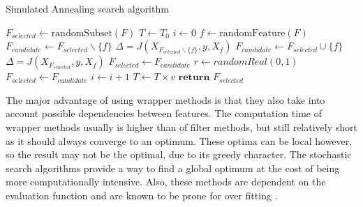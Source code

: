 \documentclass[10pt,a4paper]{report}
\begin{document}
\begin{itemize}
		\begin{algorithm}[H]
			\caption{Simulated Annealing search algorithm \cite{Reunanen2006}}\label{alg:SASearch}
			\begin{algorithmic}[1]
				\State $F_{\textit{selected}} \gets \text{randomSubset}(F)$	
				\State $T \gets T_0$			
							
				\State $i \gets 0$				
								
				\State $f \gets \text{randomFeature}(F)$	
					
				\State $F_{\textit{candidate}} \gets  F_{\textit{selected}} \backslash \{f\}$ 
				\State $\Delta = J(X_{F_{\textit{selected}} \backslash \{f\}}, y, X_f)$ 
				\Else	{}
				\State $F_{\textit{candidate}} \gets  F_{\textit{selected}} \cup \{f\}$				
				\State $\Delta = J(X_{F_{\textit{selected}}} , y, X_f)$ 
				\EndIf
				 
				\State $F_{\textit{selected}} \gets F_{\textit{candidate}}$ 
				\Else
				\State $r \gets randomReal(0, 1)$ 
				  
				\State $F_{\textit{selected}} \gets F_{\textit{candidate}}$ 
				\EndIf
				\State $i \gets i + 1$ 
				\EndIf				
				\EndWhile
				\State $T \gets T \times v$  
				\EndWhile
				\State $\textbf{return } F_{\textit{selected}}$
				\EndProcedure
			\end{algorithmic}
		\end{algorithm}
		
	\end{itemize}
	
	The major advantage of using wrapper methods is that they also take into account possible dependencies between features. The computation time of wrapper methods usually is higher than of filter methods, but still relatively short as it should always converge to an optimum. These optima can be local however, so the result may not be the optimal, due to its greedy character. The stochastic search algorithms provide a way to find a global optimum at the cost of being more computationally intensive. Also, these methods are dependent on the evaluation function and are known to be prone for over fitting \cite{Reunanen2006, saeys2007review}.
	
\end{document}
